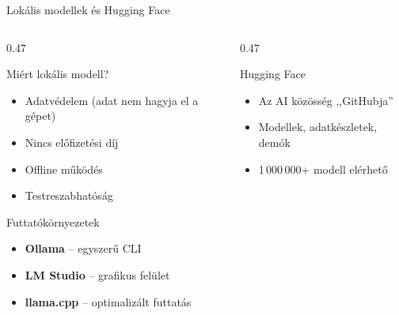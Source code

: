\documentclass[aspectratio=169, 12pt]{beamer}
\begin{document}
\begin{frame}{Lokális modellek és Hugging Face}
  \footnotesize
  \begin{columns}[T,onlytextwidth]
    \begin{column}{0.47\textwidth}
      \begin{block}{Miért lokális modell?}
        \begin{itemize}\setlength{\itemsep}{1pt}
          \item Adatvédelem (adat nem hagyja el a gépet)
          \item Nincs előfizetési díj
          \item Offline működés
          \item Testreszabhatóság
        \end{itemize}
      \end{block}

      \vspace{0.2cm}

      \begin{exampleblock}{Futtatókörnyezetek}
        \begin{itemize}\setlength{\itemsep}{1pt}
          \item \textbf{Ollama} -- egyszerű CLI
          \item \textbf{LM Studio} -- grafikus felület
          \item \textbf{llama.cpp} -- optimalizált futtatás
        \end{itemize}
      \end{exampleblock}
    \end{column}
    \begin{column}{0.47\textwidth}
      \begin{block}{Hugging Face}
        \begin{itemize}\setlength{\itemsep}{1pt}
          \item Az AI közösség ,,GitHubja''
          \item Modellek, adatkészletek, demók
          \item 1\,000\,000+ modell elérhető
        \end{itemize}
      \end{block}

      \vspace{0.2cm}


\end{column}
\end{columns}
\end{frame}
\end{document}
